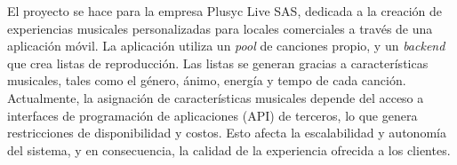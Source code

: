 \documentclass[
11pt, %
]{charter}
\begin{document}




El proyecto se hace para la empresa Plusyc Live SAS, dedicada a la creación de experiencias musicales personalizadas para locales comerciales a través de una aplicación móvil. La aplicación utiliza un \textit{pool} de canciones propio, y un \textit{backend} que crea listas de reproducción. Las listas se generan gracias a características musicales, tales como el género, ánimo, energía y tempo de cada canción. Actualmente, la asignación de características musicales depende del acceso a interfaces de programación de aplicaciones (API) de terceros, lo que genera restricciones de disponibilidad y costos. Esto afecta la escalabilidad y autonomía del sistema, y en consecuencia, la calidad de la experiencia ofrecida a los clientes.
\end{document}
